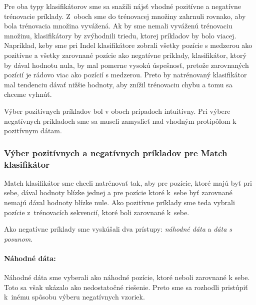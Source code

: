 Pre oba typy klasifikátorov sme sa snažili nájsť vhodné pozitívne a negatívne trénovacie príklady. Z~oboch sme do trénovacej množiny zahrnuli rovnako, aby bola trénovacia množina vyvážená. Ak by sme nemali vyváženú trénovaciu množinu, klasifikátory by zvýhodnili triedu, ktorej príkladov by bolo viacej. Napríklad, keby sme pri Indel klasifikátore zobrali všetky pozície s medzerou ako pozitívne a všetky zarovnané pozície ako negatívne príklady, klasifikátor, ktorý by dával hodnotu nula, by mal pomerne vysokú úspešnosť, pretože zarovnaných pozícií je rádovo viac ako pozícií s medzerou. Preto by natrénovaný klasifikátor mal tendenciu dávať nižšie hodnoty, aby znížil trénovaciu chybu a tomu sa chceme vyhnúť.

Výber pozitívnych príkladov bol v oboch prípadoch intuitívny. Pri výbere negatívnych príkladoch sme sa museli zamyslieť nad vhodným protipôlom k pozitívnym dátam.

\subsubsection{Výber pozitívnych a negatívnych príkladov pre Match klasifikátor}

Match klasifikátor sme chceli natrénovať tak, aby pre pozície, ktoré majú byť pri sebe, dával hodnoty blízke jednej a pre pozície ktoré k~sebe byť zarovnané nemajú dával hodnoty blízke nule.
Ako pozitívne príklady sme teda vybrali pozície z~trénovacích sekvencií, ktoré boli zarovnané k~sebe.

Ako negatívne príklady sme vyskúšali dva prístupy: \textit{náhodné dáta} a \textit{dáta s posunom}.

\paragraph{Náhodné dáta:} Náhodné dáta sme vyberali ako náhodné pozície, ktoré neboli zarovnané k sebe. Toto sa však ukázalo ako nedostatočné riešenie.
Preto sme sa rozhodli pristúpiť k~inému spôsobu výberu negatívnych vzoriek.


